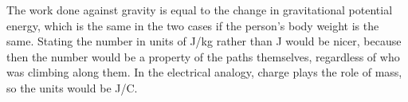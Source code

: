 The work done against gravity is equal to the change in gravitational potential energy,
which is the same in the two cases if the person's body weight is the same.
Stating the number in units of J/kg rather than J would be nicer, because then
the number would be a property of the paths themselves, regardless of who was
climbing along them. In the electrical analogy, charge plays the role of mass,
so the units would be J/C.
